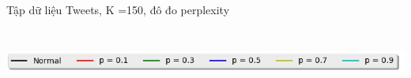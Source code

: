 \documentclass[pdf]{beamer}
\begin{document}
\begin{frame}{Tập dữ liệu Tweets, K =150, đô đo perplexity}
\begin{columns}[T] %
	\begin{column}{.50\textwidth}
		\begin{figure}
		\end{figure}
	\end{column} %
	\hfill%
	\begin{column}{.50\textwidth}
		\begin{figure}
		\end{figure}				
	\end{column} %
\end{columns}
\begin{center}
	\includegraphics[width=1\textwidth]{menu.png}	
\end{center}
\end{frame}
\end{document}
